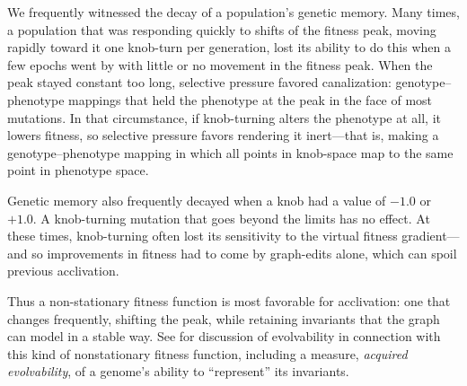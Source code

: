 \documentclass[letterpaper]{article}
\begin{document}
We frequently witnessed the decay of a population's genetic memory. Many
times, a population that was responding quickly to shifts of the fitness peak,
moving rapidly toward it one knob-turn per generation, lost its ability to do
this when a few epochs went by with little or no movement in the fitness peak.
When the peak stayed constant too long, selective pressure favored
canalization: genotype--phenotype mappings that held the phenotype at the peak
in the face of most mutations. In that circumstance, if knob-turning alters
the phenotype at all, it lowers fitness, so selective pressure favors
rendering it inert---that is, making a genotype--phenotype mapping in which
all points in knob-space map to the same point in phenotype space.

Genetic memory also frequently decayed when a knob had a value of $-1.0$
or $+1.0$. A knob-turning mutation that goes beyond the
limits has no effect. At these times, knob-turning often lost its
sensitivity to the virtual fitness gradient---and so improvements in fitness
had to come by graph-edits alone, which can spoil previous acclivation. 

Thus a non-stationary fitness function is most favorable for acclivation: one
that changes frequently, shifting the peak, while retaining invariants that
the graph can model in a stable way. See \citet{reisinger2005towards} for
discussion of evolvability in connection with this kind of nonstationary
fitness function, including a measure, \textit{acquired evolvability}, of a
genome's ability to ``represent'' its invariants.


%
\end{document}
